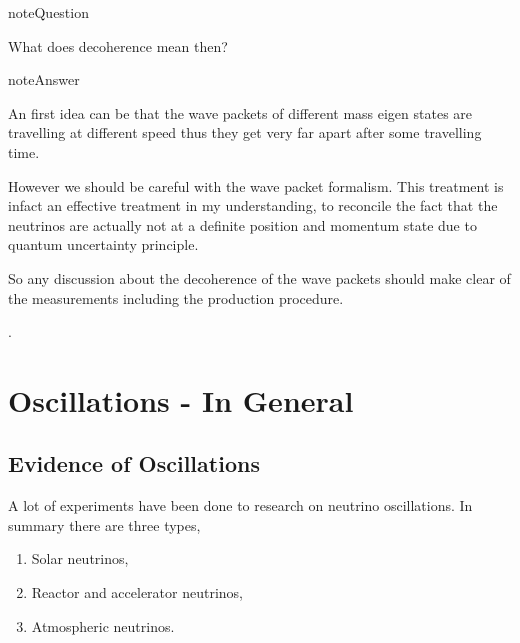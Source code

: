 \documentclass[letterpaper,12pt,english]{sphinxmanual}
\begin{document}
\begin{notice}{note}{Question}

What does decoherence mean then?
\end{notice}

\begin{notice}{note}{Answer}

An first idea can be that the wave packets of different mass eigen states are travelling at different speed thus they get very far apart after some travelling time.

However we should be careful with the wave packet formalism. This treatment is infact an effective treatment in my understanding, to reconcile the fact that the neutrinos are actually not at a definite position and momentum state due to quantum uncertainty principle.

So any discussion about the decoherence of the wave packets should make clear of the measurements including the production procedure.
\end{notice}

.


\chapter{Oscillations - In General}
\label{oscillations:oscillations-in-general}\label{oscillations::doc}

\section{Evidence of Oscillations}
\label{oscillations:evidence-of-oscillations}
A lot of experiments have been done to research on neutrino oscillations. In summary there are three types,
\begin{enumerate}
\item {} 
Solar neutrinos,

\item {} 
Reactor and accelerator neutrinos,

\item {} 
Atmospheric neutrinos.

\end{enumerate}
\end{document}
